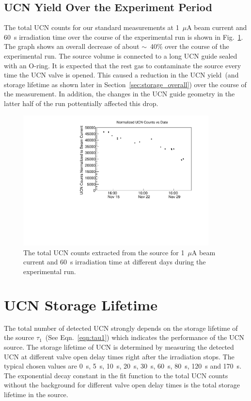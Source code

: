 \subsection{UCN Yield Over the Experiment Period}

The total UCN counts for our standard measurements at 1~$\mu$A beam
current and 60~s irradiation time over the course of the experimental
run is shown in Fig.~\ref{fig:UCNCounts_time}. The graph shows an
overall decrease of about $\sim$~40\% over the course of the
experimental run.  The source volume is connected to a long UCN guide
sealed with an O-ring. It is expected that the rest gas to contaminate
the source every time the UCN valve is opened. This caused a reduction
in the UCN yield~(and storage lifetime as shown later in
Section~\ref{sec:storage_overall}) over the course of the
measurement. In addition, the changes in the UCN guide geometry in the
latter half of the run pottentially affected this drop.


\begin{figure}[h]
  \centering
  \includegraphics[width=0.9\textwidth]{UCNCounts_vs_time.pdf}
  \caption{The total UCN counts extracted from the source for 1~$\mu$A
    beam current and 60~s irradiation time at different days during
    the experimental run. }
  \label{fig:UCNCounts_time}
\end{figure}

\section{UCN Storage Lifetime~\label{storagelifetime}}

The total number of detected UCN strongly depends on the storage
lifetime of the source $\tau_1$~(See Eqn.~\ref{eqn:tau1}) which
indicates the performance of the UCN source. The storage lifetime of
UCN is determined by measuring the detected UCN at different valve
open delay times right after the irradiation stops.  The typical
chosen values are 0~s, 5~s, 10~s, 20~s, 30~s, 60~s, 80~s, 120~s and
170~s.
The exponential decay constant in the fit function to the total UCN
counts without the background for different valve open delay times is
the total storage lifetime in the source.

